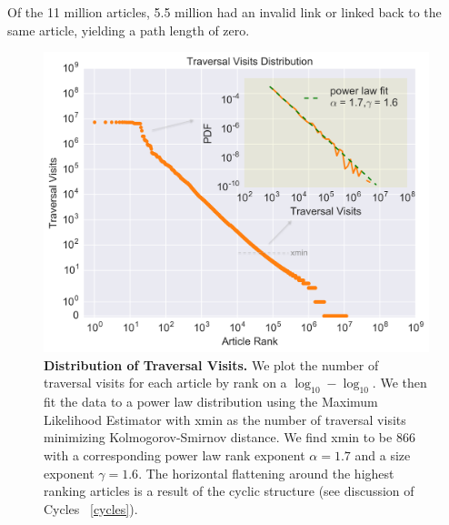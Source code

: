 \documentclass[pre,twocolumn,twoside,superscriptaddress,floatfix, aps, 10pt]{revtex4-1}
\begin{document}
Of the 11 million articles, 5.5 million had an invalid link or linked back to the same article, yielding a path length of zero. 
\begin{figure}[tp!]
  \includegraphics[width=\columnwidth]{graphics/traversals_per_article.png} 
  \caption{
    \textbf{Distribution of Traversal Visits.}
    We plot the number of traversal visits for each article by rank on a $\log_{10}-\log_{10}$. We then fit the data to a power law 
    distribution using the Maximum Likelihood Estimator with xmin as the number of traversal visits minimizing Kolmogorov-Smirnov distance. We find xmin to be 866 with a corresponding power law rank exponent $\alpha = 1.7$ and a size exponent $\gamma = 1.6$.
The horizontal flattening around the highest
ranking articles is a result of the cyclic structure (see discussion of Cycles ~\ref{cycles}).
}
  \label{fig:Distribution of Visits}
\end{figure}
\end{document}
